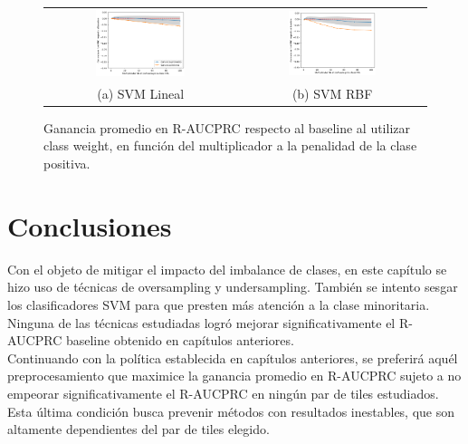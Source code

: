 \begin{figure}[h!]
\begin{tabular}{cc}
  \includegraphics[width=0.49\textwidth]{Kap7/cw/linearBEST.png} &   \includegraphics[width=0.49\textwidth]{Kap7/cw/rbfBEST.png} \\
(a) SVM Lineal& (b) SVM RBF
\end{tabular}
\caption{ Ganancia promedio en R-AUCPRC respecto al baseline al utilizar class weight, en función del multiplicador a la penalidad de la clase positiva.  }
\label{fig:overall_cw}
\end{figure}

\section{Conclusiones}
\label{conclusion_imb}

Con el objeto de mitigar el impacto del imbalance de clases, en este capítulo se hizo uso de técnicas de oversampling y undersampling. También se intento sesgar los clasificadores SVM para que presten más atención a la clase minoritaria. Ninguna de las técnicas estudiadas logró mejorar significativamente el R-AUCPRC baseline obtenido en capítulos anteriores. \\

Continuando con la política establecida en capítulos anteriores, se preferirá aquél preprocesamiento que maximice la ganancia promedio en R-AUCPRC sujeto a no empeorar significativamente el R-AUCPRC en ningún par de tiles estudiados. Esta última condición busca prevenir métodos con resultados inestables, que son altamente dependientes del par de tiles elegido. \\

